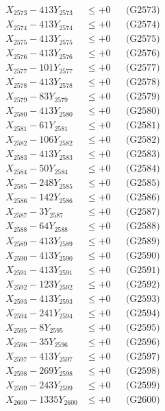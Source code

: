 \documentclass[a4paper,10pt]{article}
\begin{document}
{\begin{align}
X_{2573} - 413Y_{2573} &\leq +0 && \text{(G2573)} \\
X_{2574} - 413Y_{2574} &\leq +0 && \text{(G2574)} \\
X_{2575} - 413Y_{2575} &\leq +0 && \text{(G2575)} \\
X_{2576} - 413Y_{2576} &\leq +0 && \text{(G2576)} \\
X_{2577} - 101Y_{2577} &\leq +0 && \text{(G2577)} \\
X_{2578} - 413Y_{2578} &\leq +0 && \text{(G2578)} \\
X_{2579} - 83Y_{2579} &\leq +0 && \text{(G2579)} \\
X_{2580} - 413Y_{2580} &\leq +0 && \text{(G2580)} \\
\allowbreak
X_{2581} - 61Y_{2581} &\leq +0 && \text{(G2581)} \\
X_{2582} - 106Y_{2582} &\leq +0 && \text{(G2582)} \\
X_{2583} - 413Y_{2583} &\leq +0 && \text{(G2583)} \\
X_{2584} - 50Y_{2584} &\leq +0 && \text{(G2584)} \\
X_{2585} - 248Y_{2585} &\leq +0 && \text{(G2585)} \\
X_{2586} - 142Y_{2586} &\leq +0 && \text{(G2586)} \\
X_{2587} - 3Y_{2587} &\leq +0 && \text{(G2587)} \\
X_{2588} - 64Y_{2588} &\leq +0 && \text{(G2588)} \\
X_{2589} - 413Y_{2589} &\leq +0 && \text{(G2589)} \\
X_{2590} - 413Y_{2590} &\leq +0 && \text{(G2590)} \\
\allowbreak
X_{2591} - 413Y_{2591} &\leq +0 && \text{(G2591)} \\
X_{2592} - 123Y_{2592} &\leq +0 && \text{(G2592)} \\
X_{2593} - 413Y_{2593} &\leq +0 && \text{(G2593)} \\
X_{2594} - 241Y_{2594} &\leq +0 && \text{(G2594)} \\
X_{2595} - 8Y_{2595} &\leq +0 && \text{(G2595)} \\
X_{2596} - 35Y_{2596} &\leq +0 && \text{(G2596)} \\
X_{2597} - 413Y_{2597} &\leq +0 && \text{(G2597)} \\
X_{2598} - 269Y_{2598} &\leq +0 && \text{(G2598)} \\
X_{2599} - 243Y_{2599} &\leq +0 && \text{(G2599)} \\
X_{2600} - 1335Y_{2600} &\leq +0 && \text{(G2600)} \\

\end{align}}
\end{document}

